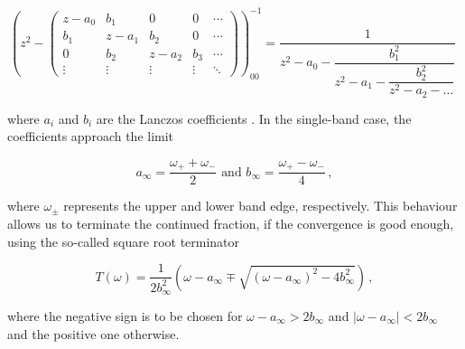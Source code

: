 \documentclass[
    reprint, 
    aps,
    preprintnumbers,
    twocolumn,
    prb,
    superscriptaddress
]{revtex4-2}
\begin{document}
\begin{widetext}
\begin{equation}
    \left( z^2 - \begin{pmatrix}
        z - a_0 & b_1 & 0 & 0 & \cdots \\
        b_1 & z - a_1 & b_2 & 0 & \cdots \\
        0 & b_2 & z - a_2 & b_3 & \cdots \\
        \vdots & \vdots & \vdots & \vdots & \ddots
    \end{pmatrix} \right)_{00}^{-1} = \dfrac{1}{z^2 - a_0 - \dfrac{b_1^2}{z^2 - a_1 - \dfrac{b_2^2}{ z^2 - a_2 - \hdots}}}\,\,
\end{equation}
\end{widetext}

where $a_i$ and $b_i$ are the Lanczos coefficients \cite{PettiforRecursion,ViswanathRecursion}.
In the single-band case, the coefficients approach the limit

\begin{equation}
    \label{eqn:inf_lanczos}
    a_\infty = \frac{\omega_+ + \omega_-}{2}\text{  and  } b_\infty = \frac{\omega_+ - \omega_-}{4}\,,
\end{equation}

where $\omega_\pm$ represents the upper and lower band edge, respectively.
This behaviour allows us to terminate the continued fraction, if the convergence is good enough, using the so-called square root terminator

\begin{equation}
    T(\omega) = \frac{1}{2b_\infty^2} \left( \omega - a_\infty \mp \sqrt{(\omega - a_\infty)^2 - 4 b_\infty^2} \right)\,,
\end{equation}

where the negative sign is to be chosen for $\omega - a_\infty > 2b_\infty$ and $|\omega - a_\infty| < 2b_\infty$ and the positive one otherwise.

\end{document}
